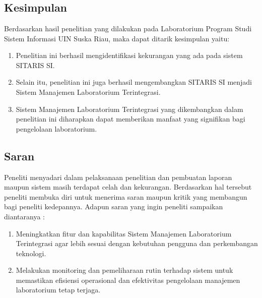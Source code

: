 %
%
%
%


\chapter{\babEnam}
\section{Kesimpulan}
Berdasarkan hasil penelitian yang dilakukan pada Laboratorium Program Studi Sistem Informasi UIN Suska Riau, maka dapat ditarik kesimpulan yaitu:

\begin{enumerate}
	\item Penelitian ini berhasil mengidentifikasi kekurangan yang ada pada sistem SITARIS SI.
	\item Selain itu, penelitian ini juga berhasil mengembangkan SITARIS SI menjadi Sistem Manajemen Laboratorium Terintegrasi.
	\item Sistem Manajemen Laboratorium Terintegrasi yang dikembangkan dalam penelitian ini diharapkan dapat memberikan manfaat yang signifikan bagi pengelolaan laboratorium.
\end{enumerate}

\section{Saran}
Peneliti menyadari dalam pelaksanaan penelitian dan pembuatan laporan maupun sistem masih terdapat celah dan kekurangan. Berdasarkan hal tersebut peneliti membuka diri untuk menerima saran maupun kritik yang membangun bagi peneliti kedepannya. Adapun saran yang ingin peneliti sampaikan diantaranya :

\begin{enumerate}
	\item Meningkatkan fitur dan kapabilitas Sistem Manajemen Laboratorium Terintegrasi agar lebih sesuai dengan kebutuhan pengguna dan perkembangan teknologi.
	\item Melakukan monitoring dan pemeliharaan rutin terhadap sistem untuk memastikan efisiensi operasional dan efektivitas pengelolaan manajemen laboratorium tetap terjaga.
\end{enumerate}
